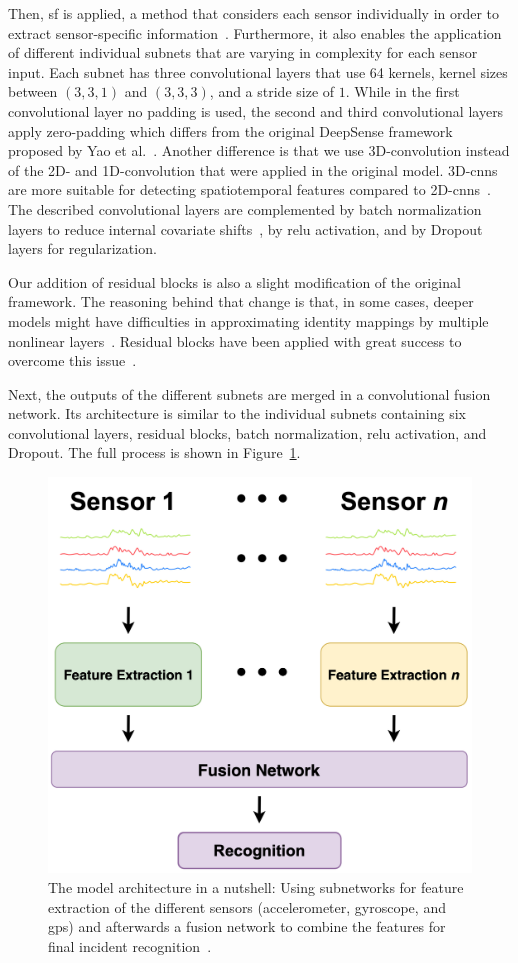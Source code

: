 Then, \ac{sf} is applied, a method that considers each sensor individually in order to extract sensor-specific information~\cite{elmenreich2002sensor}.
Furthermore, it also enables the application of different individual subnets that are varying in complexity for each sensor input.
Each subnet has three convolutional layers that use 64 kernels, kernel sizes between $(3,3,1)$ and $(3,3,3)$, and a stride size of $1$.
While in the first convolutional layer no padding is used, the second and third convolutional layers apply zero-padding which differs from the original DeepSense framework proposed by Yao et al.~\cite{yao2017deepsense}.
Another difference is that we use 3D-convolution instead of the 2D- and 1D-convolution that were applied in the original model.
3D-\acp{cnn} are more suitable for detecting spatiotemporal features compared to 2D-\acp{cnn}~\cite{tran2015learning}.
The described convolutional layers are complemented by batch normalization layers to reduce internal covariate shifts~\cite{ioffe2015batch}, by \ac{relu} activation, and by Dropout layers for regularization.

Our addition of residual blocks is also a slight modification of the original framework.
The reasoning behind that change is that, in some cases, deeper models might have difficulties in approximating identity mappings by multiple nonlinear layers~\cite{he2016deep}.
Residual blocks have been applied with great success to overcome this issue~\cite{he2016deep}.

Next, the outputs of the different subnets are merged in a convolutional fusion network.
Its architecture is similar to the individual subnets containing six convolutional layers, residual blocks, batch normalization, \ac{relu} activation, and Dropout.
The full process is shown in Figure~\ref{fig:sfn}.

\begin{figure}[t]
\centering
    \includegraphics[width=0.4\columnwidth]{fig/sensor-and-fusion-networks.png}
    \caption{The model architecture in a nutshell: Using subnetworks for feature extraction of the different sensors (accelerometer, gyroscope, and \ac{gps}) and afterwards a fusion network to combine the features for final incident recognition~\cite{chen2021deep}.}
    \label{fig:sfn}
\end{figure}

